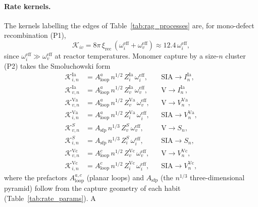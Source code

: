 \paragraph{Rate kernels.}
The kernels labelling the edges of Table~\ref{tab:rag_processes} are, for
mono-defect recombination (P1),
\begin{equation}\label{eq:P1}
    \mathcal{K}_{iv}
    = 8\pi\,\xi_{\mathrm{rec}}\,(\omega_i^{\mathrm{eff}}+\omega_v^{\mathrm{eff}})
    \approx 12.4\,\omega_i^{\mathrm{eff}},
\end{equation}
since $\omega_i^{\mathrm{eff}}\gg\omega_v^{\mathrm{eff}}$ at reactor
temperatures. Monomer capture by a size-$n$ cluster (P2) takes the
Smoluchowski form
\begin{align}
    \mathcal{K}_{i,n}^{\mathrm{Ia}}&=A_{\mathrm{loop}}^{a}\,n^{1/2}\,Z_i^{\mathrm{Ia}}\,\omega_i^{\mathrm{eff}},
        &&\text{SIA}\to I_n^{\mathrm{Ia}}, \label{eq:K_Ia_i}\\[2pt]
    \mathcal{K}_{v,n}^{\mathrm{Ia}}&=A_{\mathrm{loop}}^{a}\,n^{1/2}\,Z_v^{\mathrm{Ia}}\,\omega_v^{\mathrm{eff}},
        &&\text{V}\to I_n^{\mathrm{Ia}}, \label{eq:K_Ia_v}\\[2pt]
    \mathcal{K}_{v,n}^{\mathrm{Va}}&=A_{\mathrm{loop}}^{a}\,n^{1/2}\,Z_v^{\mathrm{Va}}\,\omega_v^{\mathrm{eff}},
        &&\text{V}\to V_n^{\mathrm{Va}}, \label{eq:K_Va_v}\\[2pt]
    \mathcal{K}_{i,n}^{\mathrm{Va}}&=A_{\mathrm{loop}}^{a}\,n^{1/2}\,Z_i^{\mathrm{Va}}\,\omega_i^{\mathrm{eff}},
        &&\text{SIA}\to V_n^{\mathrm{Va}}, \label{eq:K_Va_i}\\[2pt]
    \mathcal{K}_{v,n}^{S}&=A_{\mathrm{sfp}}\,n^{1/3}\,Z_v^{S}\,\omega_v^{\mathrm{eff}},
        &&\text{V}\to S_n, \label{eq:K_S_v}\\[2pt]
    \mathcal{K}_{i,n}^{S}&=A_{\mathrm{sfp}}\,n^{1/3}\,Z_i^{S}\,\omega_i^{\mathrm{eff}},
        &&\text{SIA}\to S_n, \label{eq:K_S_i}\\[2pt]
    \mathcal{K}_{v,n}^{\mathrm{Vc}}&=A_{\mathrm{loop}}^{c}\,n^{1/2}\,Z_v^{\mathrm{Vc}}\,\omega_v^{\mathrm{eff}},
        &&\text{V}\to V_n^{\mathrm{Vc}}, \label{eq:K_Vc_v}\\[2pt]
    \mathcal{K}_{i,n}^{\mathrm{Vc}}&=A_{\mathrm{loop}}^{c}\,n^{1/2}\,Z_i^{\mathrm{Vc}}\,\omega_i^{\mathrm{eff}},
        &&\text{SIA}\to V_n^{\mathrm{Vc}}, \label{eq:K_Vc_i}
\end{align}
where the prefactors $A_{\mathrm{loop}}^{a,c}$ (planar loops) and
$A_{\mathrm{sfp}}$ (the $n^{1/3}$ three-dimensional pyramid) follow from
the capture geometry of each habit (Table~\ref{tab:rate_params}). A
